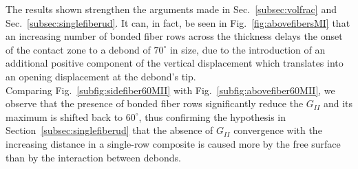 \documentclass[review]{elsarticle}
\begin{document}
The results shown strengthen the arguments made in Sec.~\ref{subsec:volfrac} and Sec.~\ref{subsec:singlefiberud}. It can, in fact, be seen in Fig.~\ref{fig:abovefibersMI} that an increasing number of bonded fiber rows across the thickness delays the onset of the contact zone to a debond of $70^{\circ}$ in size, due to the introduction of an additional positive component of the vertical displacement which translates into an opening displacement at the debond's tip.\\
Comparing Fig.~\ref{subfig:sidefiber60MII} with Fig.~\ref{subfig:abovefiber60MII}, we observe that the presence of bonded fiber rows significantly reduce the $G_{II}$ and its maximum is shifted back to $60^{\circ}$, thus confirming the hypothesis in Section~\ref{subsec:singlefiberud} that the absence of $G_{II}$ convergence with the increasing distance in a single-row composite is caused more by the free surface than by the interaction between debonds.
\end{document}
